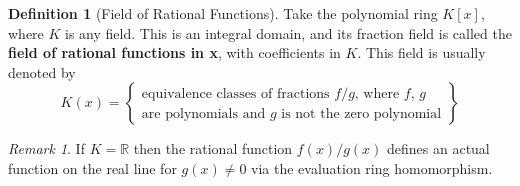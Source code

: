 \documentclass[12pt]{article}
\theoremstyle{definition}
\newtheorem{defn}[thm]{Definition}
\theoremstyle{remark}
\newtheorem{rmk}[thm]{Remark}
\numberwithin{equation}{section}
\newcommand\R{\mathbb R}    %
\newcommand\B[1]{\textbf{ #1}}
\begin{document}
\vspace{15pt}

\begin{defn}[Field of Rational Functions]
        Take the polynomial ring $K[x]$, where $K$ is any field. This is an integral domain, and its fraction field is called the \B{field of rational functions in x}, with coefficients in $K$. This field is usually denoted by \begin{equation}
                K(x) = \left\{\begin{array}{c} \text{equivalence classes of fractions $f/g$, where $f$, $g$}\\ \text{are polynomials and $g$ is not the zero polynomial}\end{array}\right\}
        \end{equation}
\end{defn}

\vspace{15pt}

\begin{rmk}
        If $K =\R$ then the rational function $f(x)/g(x)$ defines an actual function on the real line for $g(x) \neq 0$ via the evaluation ring homomorphism.
\end{rmk}

\vspace{15pt}
\end{document}
